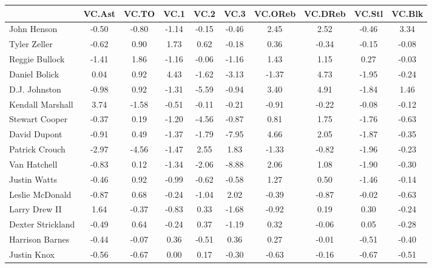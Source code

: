 \documentclass[10pt,letterpaper]{article}
\begin{document}
\begin{table}[ht]
\begin{center}
\begin{tabular}{lccccccccc}
  \hline
 & VC.Ast & VC.TO & VC.1 & VC.2 & VC.3 & VC.OReb & VC.DReb & VC.Stl & VC.Blk \\ 
  \hline
John Henson & -0.50 & -0.80 & -1.14 & -0.15 & -0.46 & 2.45 & 2.52 & -0.46 & 3.34 \\ 
  Tyler Zeller & -0.62 & 0.90 & 1.73 & 0.62 & -0.18 & 0.36 & -0.34 & -0.15 & -0.08 \\ 
  Reggie Bullock & -1.41 & 1.86 & -1.16 & -0.06 & -1.16 & 1.43 & 1.15 & 0.27 & -0.03 \\ 
  Daniel Bolick & 0.04 & 0.92 & 4.43 & -1.62 & -3.13 & -1.37 & 4.73 & -1.95 & -0.24 \\ 
  D.J. Johnston & -0.98 & 0.92 & -1.31 & -5.59 & -0.94 & 3.40 & 4.91 & -1.84 & 1.46 \\ 
  Kendall Marshall & 3.74 & -1.58 & -0.51 & -0.11 & -0.21 & -0.91 & -0.22 & -0.08 & -0.12 \\ 
  Stewart Cooper & -0.37 & 0.19 & -1.20 & -4.56 & -0.87 & 0.81 & 1.75 & -1.76 & -0.63 \\ 
  David Dupont & -0.91 & 0.49 & -1.37 & -1.79 & -7.95 & 4.66 & 2.05 & -1.87 & -0.35 \\ 
  Patrick Crouch & -2.97 & -4.56 & -1.47 & 2.55 & 1.83 & -1.33 & -0.82 & -1.96 & -0.23 \\ 
  Van Hatchell & -0.83 & 0.12 & -1.34 & -2.06 & -8.88 & 2.06 & 1.08 & -1.90 & -0.30 \\ 
  Justin Watts & -0.46 & 0.92 & -0.99 & -0.62 & -0.58 & 1.27 & 0.50 & -1.46 & -0.14 \\ 
  Leslie McDonald & -0.87 & 0.68 & -0.24 & -1.04 & 2.02 & -0.39 & -0.87 & -0.02 & -0.63 \\ 
  Larry Drew II & 1.64 & -0.37 & -0.83 & 0.33 & -1.68 & -0.92 & 0.19 & 0.30 & -0.24 \\ 
  Dexter Strickland & -0.49 & 0.64 & -0.24 & 0.37 & -1.19 & 0.32 & -0.06 & 0.05 & -0.28 \\ 
  Harrison Barnes & -0.44 & -0.07 & 0.36 & -0.51 & 0.36 & 0.27 & -0.01 & -0.51 & -0.40 \\ 
  Justin Knox & -0.56 & -0.67 & 0.00 & 0.17 & -0.30 & -0.63 & -0.16 & -0.67 & -0.51 \\ 
   \hline
\end{tabular}
\end{center}
\end{table}
\end{document}
